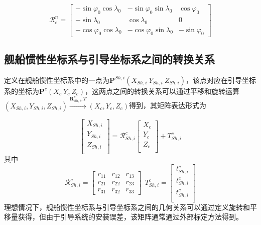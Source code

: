 \begin{equation}
\mathcal{R}_e^n=\left[\begin{array}{ccc}
-\sin \varphi _{0} \cos \lambda _{0} & -\sin \varphi _{0} \sin \lambda _{0} & \cos \varphi _{0}  \\
-\sin \lambda _{0}           &           \cos \lambda _{0}            &          0           \\
-\cos \varphi _{0} \cos \lambda _{0} & -\cos \varphi _{0} \sin \lambda _{0} & -\sin \varphi _{0}
\end{array}\right]
\end{equation}

\subsection{舰船惯性坐标系与引导坐标系之间的转换关系}
定义在舰船惯性坐标系中的一点为$\mathbf{P}^{Sh,i}(X_{Sh,i}\ Y_{Sh,i}\ Z_{Sh,i})$，该点对应在引导坐标系的坐标为$\mathbf{P}^{c}(X_c\ Y_c\ Z_c)$，这两点之间的转换关系可以通过平移和旋转运算$(X_{Sh,i}, Y_{Sh,i}, Z_{Sh,i})\xrightarrow{\textbf{R}_{Sh,i}^c,T}(X_c, Y_c, Z_c) $得到，其矩阵表达形式为

\begin{equation}
\left[\begin{array}{c}
X_{Sh,i}\\
Y_{Sh,i}\\
Z_{Sh,i}\\
\end{array}\right]=\mathcal{R}_{Sh,i}^c
\left[\begin{array}{c}
X_{c}\\
Y_{c}\\
Z_{c}\\
\end{array}\right]+T_{Sh,i}^c
\end{equation}
其中
\begin{equation}
\mathcal{R}_{Sh,i}^c=\left[\begin{array}{ccc}
r_{11} & r_{12} & r_{13} \\
r_{21} & r_{22} & r_{23} \\
r_{31} & r_{32} & r_{33} 
\end{array}\right]
\ \ 
T_{Sh,i}^c=\left[\begin{array}{ccc}
t_{Sh,i}^c\\
t_{Sh,i}^c\\
t_{Sh,i}^c\\
\end{array}\right]
\end{equation}
理想情况下，舰船惯性坐标系与引导坐标系之间的几何关系可以通过定义旋转和平移量获得，但由于引导系统的安装误差，该矩阵通常通过外部标定方法得到。


​




